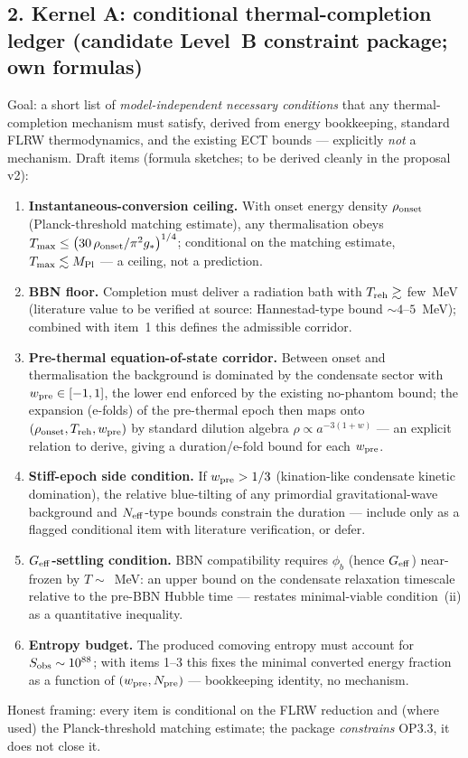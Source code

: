 \subsection*{2. Kernel A: conditional thermal-completion ledger
(candidate Level~B constraint package; own formulas)}
Goal: a short list of \emph{model-independent necessary
conditions} that any thermal-completion mechanism must satisfy,
derived from energy bookkeeping, standard FLRW thermodynamics, and
the existing ECT bounds --- explicitly \emph{not} a mechanism.
Draft items (formula sketches; to be derived cleanly in the
proposal v2):
\begin{enumerate}
  \item \textbf{Instantaneous-conversion ceiling.}
    With onset energy density $\rho_{\rm onset}$ (Planck-threshold
    matching estimate), any thermalisation obeys
    $T_{\max}\le\bigl(30\,\rho_{\rm onset}/\pi^2 g_*\bigr)^{1/4}$;
    conditional on the matching estimate, $T_{\max}\lesssim
    M_{\rm Pl}$ --- a ceiling, not a prediction.
  \item \textbf{BBN floor.}
    Completion must deliver a radiation bath with
    $T_{\rm reh}\gtrsim$ few~MeV (literature value to be
    verified at source: Hannestad-type bound $\sim4$--$5$~MeV);
    combined with item~1 this defines the admissible corridor.
  \item \textbf{Pre-thermal equation-of-state corridor.}
    Between onset and thermalisation the background is dominated
    by the condensate sector with $w_{\rm pre}\in[-1,1]$, the
    lower end enforced by the existing no-phantom bound; the
    expansion (e-folds) of the pre-thermal epoch then maps onto
    $(\rho_{\rm onset},T_{\rm reh},w_{\rm pre})$ by standard
    dilution algebra $\rho\propto a^{-3(1+w)}$ --- an explicit
    relation to derive, giving a duration/e-fold bound for each
    $w_{\rm pre}$.
  \item \textbf{Stiff-epoch side condition.}
    If $w_{\rm pre}>1/3$ (kination-like condensate kinetic
    domination), the relative blue-tilting of any primordial
    gravitational-wave background and $N_{\rm eff}$-type bounds
    constrain the duration --- include only as a flagged
    conditional item with literature verification, or defer.
  \item \textbf{$G_{\rm eff}$-settling condition.}
    BBN compatibility requires $\phi_b$ (hence $G_{\rm eff}$)
    near-frozen by $T\sim$~MeV: an upper bound on the condensate
    relaxation timescale relative to the pre-BBN Hubble time ---
    restates minimal-viable condition~(ii) as a quantitative
    inequality.
  \item \textbf{Entropy budget.}
    The produced comoving entropy must account for
    $S_{\rm obs}\sim10^{88}$; with items 1--3 this fixes the
    minimal converted energy fraction as a function of
    $(w_{\rm pre}, N_{\rm pre})$ --- bookkeeping identity, no
    mechanism.
\end{enumerate}
Honest framing: every item is conditional on the FLRW reduction
and (where used) the Planck-threshold matching estimate; the
package \emph{constrains} OP3.3, it does not close it.

